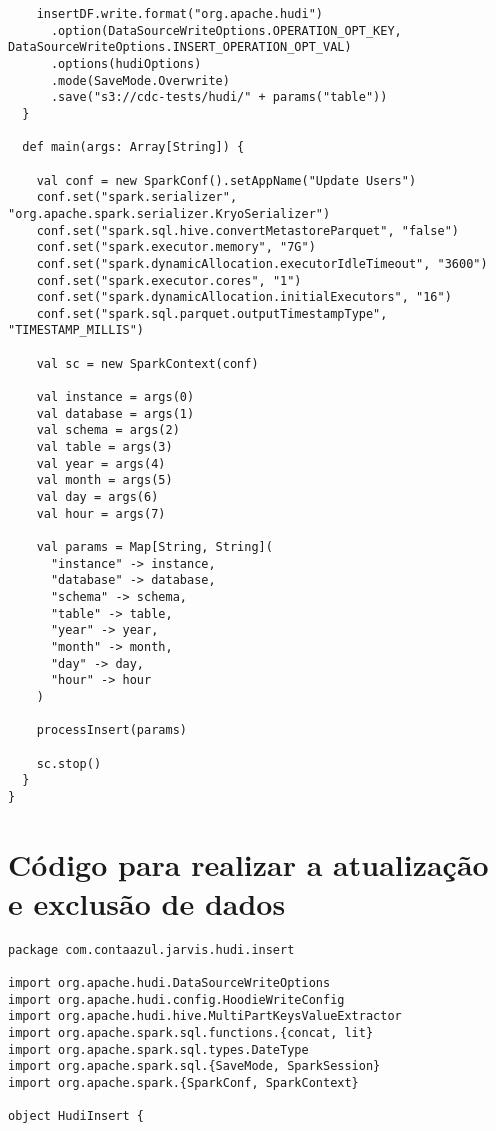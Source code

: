 \documentclass[12pt, oneside, a4paper, brazil]{abntex2}
\begin{document}
\begin{apendicesenv}
\begin{lstlisting}
    insertDF.write.format("org.apache.hudi")
      .option(DataSourceWriteOptions.OPERATION_OPT_KEY, DataSourceWriteOptions.INSERT_OPERATION_OPT_VAL)
      .options(hudiOptions)
      .mode(SaveMode.Overwrite)
      .save("s3://cdc-tests/hudi/" + params("table"))
  }

  def main(args: Array[String]) {

    val conf = new SparkConf().setAppName("Update Users")
    conf.set("spark.serializer", "org.apache.spark.serializer.KryoSerializer")
    conf.set("spark.sql.hive.convertMetastoreParquet", "false")
    conf.set("spark.executor.memory", "7G")
    conf.set("spark.dynamicAllocation.executorIdleTimeout", "3600")
    conf.set("spark.executor.cores", "1")
    conf.set("spark.dynamicAllocation.initialExecutors", "16")
    conf.set("spark.sql.parquet.outputTimestampType", "TIMESTAMP_MILLIS")

    val sc = new SparkContext(conf)

    val instance = args(0)
    val database = args(1)
    val schema = args(2)
    val table = args(3)
    val year = args(4)
    val month = args(5)
    val day = args(6)
    val hour = args(7)

    val params = Map[String, String](
      "instance" -> instance,
      "database" -> database,
      "schema" -> schema,
      "table" -> table,
      "year" -> year,
      "month" -> month,
      "day" -> day,
      "hour" -> hour
    )

    processInsert(params)

    sc.stop()
  }
}

\end{lstlisting}

\chapter{Código para realizar a atualização e exclusão de dados} \label{apendice}

\begin{lstlisting}
package com.contaazul.jarvis.hudi.insert

import org.apache.hudi.DataSourceWriteOptions
import org.apache.hudi.config.HoodieWriteConfig
import org.apache.hudi.hive.MultiPartKeysValueExtractor
import org.apache.spark.sql.functions.{concat, lit}
import org.apache.spark.sql.types.DateType
import org.apache.spark.sql.{SaveMode, SparkSession}
import org.apache.spark.{SparkConf, SparkContext}

object HudiInsert {


\end{lstlisting}
\end{apendicesenv}
\end{document}
